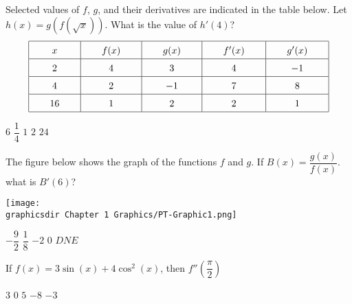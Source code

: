 \begin{questions}
    \newpage

    \question Selected values of $f$, $g$, and their derivatives are indicated in the table below. Let $h(x) = g\left(f\left(\sqrt{x}\right)\right)$. What is the value of $h'(4)$? \begin{align*}
        \arraycolsep=22pt\def\arraystretch{1.5} 
        \begin{array}{|c|c|c|c|c|}
            \hline
            x & f(x) & g(x) & f'(x) & g'(x) \\ \hline
            2 & 4 & 3 & 4 & -1 \\ \hline
            4 & 2 & -1 & 7 & 8 \\ \hline
            16 & 1 & 2 & 2 & 1 \\
            \hline
        \end{array}
    \end{align*}

    \begin{oneparchoices}
        \choice $6$
        \choice $\dfrac{1}{4}$
        \choice $1$
        \choice $2$
        \choice $24$
    \end{oneparchoices} \par \horizontalline

    \question The figure below shows the graph of the functions $f$ and $g$. If $B(x) = \dfrac{g(x)}{f(x)}$. what is $B'(6)$? \\
    \begin{center}
        \texttt{[image: \\graphicsdir Chapter 1 Graphics/PT-Graphic1.png]}
    \end{center} \vspace{11pt}

    \begin{oneparchoices}
        \choice $-\dfrac{9}{2}$
        \choice $\dfrac{1}{8}$
        \choice $-2$
        \choice $0$
        \choice $DNE$
    \end{oneparchoices} \par \horizontalline

    \question If $f(x) = 3\sin (x) + 4\cos^2 (x)$, then $f''\left(\dfrac{\pi}{2}\right)$ \\

    \begin{oneparchoices}
        \choice $3$
        \choice $0$
        \choice $5$
        \choice $-8$
        \choice $-3$
    \end{oneparchoices} \par \horizontalline


\end{questions}
